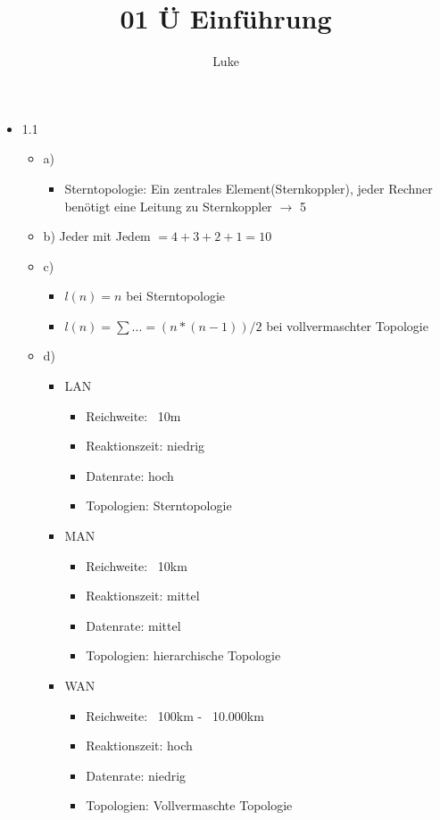 \documentclass[a4paper, 12pt] {article} %
\title{01 Ü Einführung}
\begin{document}
\maketitle
\author{Luke}

\begin{itemize}
\item 1.1
\begin{itemize}
	\item a)
	\begin{itemize}
		\item Sterntopologie: Ein zentrales Element(Sternkoppler), jeder 			Rechner benötigt eine Leitung zu Sternkoppler \(\to\) 5
	\end{itemize}
	\item b) Jeder mit Jedem \(= 4+3+2+1=10\)
	\item c) 
	\begin{itemize}
		\item \(l(n)= n\) bei Sterntopologie
		\item \(l(n) = \sum ... = (n*(n-1))/2\) bei vollvermaschter 					Topologie
	\end{itemize}
	\item d)
	\begin{itemize}
		\item LAN
		\begin{itemize}
			\item Reichweite: ~10m
			\item Reaktionszeit: niedrig
			\item Datenrate: hoch
			\item Topologien: Sterntopologie
		\end{itemize}
		\item MAN
		\begin{itemize}
			\item Reichweite: ~10km
			\item Reaktionszeit: mittel
			\item Datenrate: mittel
			\item Topologien: hierarchische Topologie
		\end{itemize}
		\item WAN
		\begin{itemize}
			\item Reichweite: ~100km - ~10.000km
			\item Reaktionszeit: hoch
			\item Datenrate: niedrig
			\item Topologien: Vollvermaschte Topologie
		\end{itemize}

\end{itemize}
\end{itemize}
\end{itemize}
\end{document}
